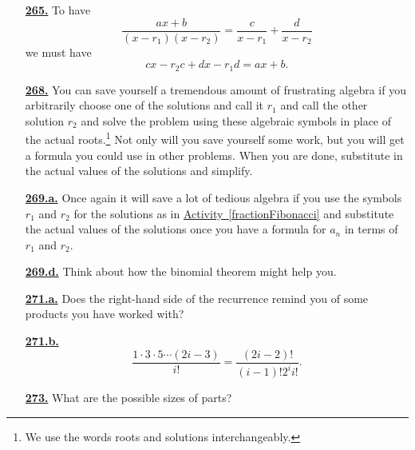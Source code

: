 \documentclass[10pt,]{book}
\theoremstyle{plain}
\theoremstyle{definition}
\theoremstyle{definition}
\theoremstyle{definition}
\numberwithin{equation}{chapter}
\begin{document}
\begin{itemize}[itemsep=1em]
\hypertarget{a-265}{}\item[\textbf{\hyperref[partialfractions1]{265.}}]
\hypertarget{p-1360}{}%
To have%
\begin{equation*}
\frac{ax+b}{(x-r_1)(x-r_2)} = \frac{c}{x-r_1} + \frac{d}{x-r_2}
\end{equation*}
we must have%
\begin{equation*}
cx-r_2c+dx-r_1d =ax+b\text{.}
\end{equation*}
%

\hypertarget{a-268}{}\item[\textbf{\hyperref[fractionFibonacci]{268.}}]
\hypertarget{p-1368}{}%
You can save yourself a tremendous amount of frustrating algebra if you arbitrarily choose one of the solutions and call it \(r_1\) and call the other solution \(r_2\) and solve the problem using these algebraic symbols in place of the actual roots.\footnote{We use the words roots and solutions interchangeably.\label{fn-18}} Not only will you save yourself some work, but you will get a formula you could use in other problems. When you are done, substitute in the actual values of the solutions and simplify.%

\hypertarget{a-269.a}{}\item[\textbf{\hyperref[task-247]{269.a.}}]
\hypertarget{p-1371}{}%
Once again it will save a lot of tedious algebra if you use the symbols \(r_1\) and \(r_2\) for the solutions as in \hyperref[fractionFibonacci]{Activity~\ref{fractionFibonacci}} and substitute the actual values of the solutions once you have a formula for \(a_n\) in terms of \(r_1\) and \(r_2\).%

\hypertarget{a-269.d}{}\item[\textbf{\hyperref[task-250]{269.d.}}]
\hypertarget{p-1378}{}%
Think about how the binomial theorem might help you.%

\hypertarget{a-271.a}{}\item[\textbf{\hyperref[task-252]{271.a.}}]
\hypertarget{p-1386}{}%
Does the right-hand side of the recurrence remind you of some products you have worked with?%

\hypertarget{a-271.b}{}\item[\textbf{\hyperref[task-253]{271.b.}}]
\hypertarget{p-1389}{}%
%
\begin{equation*}
\frac{1\cdot 3\cdot 5\cdots (2i-3)}{i!} = \frac{(2i-2)!}{(i-1)!2^i i!}\text{.}
\end{equation*}
%

\hypertarget{a-273}{}\item[\textbf{\hyperref[activity-266]{273.}}]
\hypertarget{p-1398}{}%
What are the possible sizes of parts?%


\end{itemize}
\end{document}
